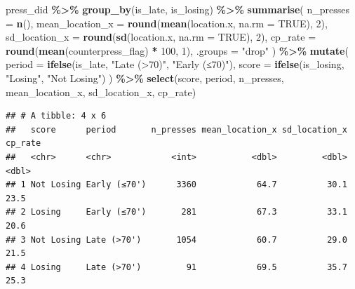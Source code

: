 \documentclass[
]{article}
\newenvironment{Shaded}{\begin{snugshade}}{\end{snugshade}}
\newcommand{\AttributeTok}[1]{\textcolor[rgb]{0.13,0.29,0.53}{#1}}
\newcommand{\ConstantTok}[1]{\textcolor[rgb]{0.56,0.35,0.01}{#1}}
\newcommand{\DecValTok}[1]{\textcolor[rgb]{0.00,0.00,0.81}{#1}}
\newcommand{\FunctionTok}[1]{\textcolor[rgb]{0.13,0.29,0.53}{\textbf{#1}}}
\newcommand{\NormalTok}[1]{#1}
\newcommand{\SpecialCharTok}[1]{\textcolor[rgb]{0.81,0.36,0.00}{\textbf{#1}}}
\newcommand{\StringTok}[1]{\textcolor[rgb]{0.31,0.60,0.02}{#1}}
\begin{document}
\begin{Shaded}
\begin{Highlighting}[]
\NormalTok{press\_did }\SpecialCharTok{\%\textgreater{}\%}
  \FunctionTok{group\_by}\NormalTok{(is\_late, is\_losing) }\SpecialCharTok{\%\textgreater{}\%}
  \FunctionTok{summarise}\NormalTok{(}
    \AttributeTok{n\_presses       =} \FunctionTok{n}\NormalTok{(),}
    \AttributeTok{mean\_location\_x =} \FunctionTok{round}\NormalTok{(}\FunctionTok{mean}\NormalTok{(location.x, }\AttributeTok{na.rm =} \ConstantTok{TRUE}\NormalTok{), }\DecValTok{2}\NormalTok{),}
    \AttributeTok{sd\_location\_x   =} \FunctionTok{round}\NormalTok{(}\FunctionTok{sd}\NormalTok{(location.x,   }\AttributeTok{na.rm =} \ConstantTok{TRUE}\NormalTok{), }\DecValTok{2}\NormalTok{),}
    \AttributeTok{cp\_rate         =} \FunctionTok{round}\NormalTok{(}\FunctionTok{mean}\NormalTok{(counterpress\_flag) }\SpecialCharTok{*} \DecValTok{100}\NormalTok{, }\DecValTok{1}\NormalTok{),}
    \AttributeTok{.groups =} \StringTok{"drop"}
\NormalTok{  ) }\SpecialCharTok{\%\textgreater{}\%}
  \FunctionTok{mutate}\NormalTok{(}
    \AttributeTok{period =} \FunctionTok{ifelse}\NormalTok{(is\_late,   }\StringTok{"Late (\textgreater{}70\textquotesingle{})"}\NormalTok{, }\StringTok{"Early (≤70\textquotesingle{})"}\NormalTok{),}
    \AttributeTok{score  =} \FunctionTok{ifelse}\NormalTok{(is\_losing, }\StringTok{"Losing"}\NormalTok{,      }\StringTok{"Not Losing"}\NormalTok{)}
\NormalTok{  ) }\SpecialCharTok{\%\textgreater{}\%}
  \FunctionTok{select}\NormalTok{(score, period, n\_presses, mean\_location\_x, sd\_location\_x, cp\_rate)}
\end{Highlighting}
\end{Shaded}

\begin{verbatim}
## # A tibble: 4 x 6
##   score      period       n_presses mean_location_x sd_location_x cp_rate
##   <chr>      <chr>            <int>           <dbl>         <dbl>   <dbl>
## 1 Not Losing Early (≤70')      3360            64.7          30.1    23.5
## 2 Losing     Early (≤70')       281            67.3          33.1    20.6
## 3 Not Losing Late (>70')       1054            60.7          29.0    21.5
## 4 Losing     Late (>70')         91            69.5          35.7    25.3
\end{verbatim}
\end{document}
